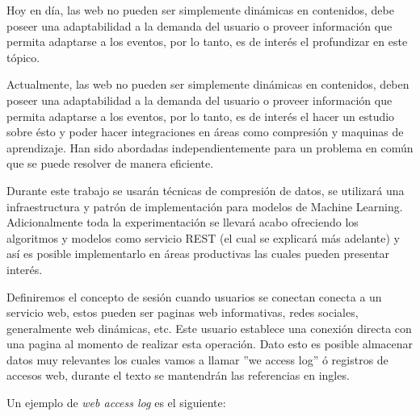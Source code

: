   Hoy en día, las web no pueden ser simplemente dinámicas en contenidos, debe poseer una adaptabilidad a la demanda del usuario o proveer información que permita adaptarse a los eventos, por lo tanto, es de interés el profundizar en este tópico.

  Actualmente, las web no pueden ser simplemente dinámicas en contenidos, deben poseer una adaptabilidad a la demanda del usuario o proveer información que permita adaptarse a los eventos, por lo tanto, es de interés el hacer un estudio sobre ésto y poder hacer integraciones en áreas como compresión y maquinas de aprendizaje. Han sido abordadas independientemente para un problema en común que se puede resolver de manera eficiente. 

  Durante este trabajo se usarán técnicas de compresión de datos, se utilizará una infraestructura y patrón de implementación para modelos de Machine Learning. Adicionalmente toda la experimentación se llevará acabo ofreciendo los algoritmos y modelos como servicio REST (el cual se explicará más adelante) y así es posible implementarlo en áreas productivas las cuales pueden presentar interés.

  Definiremos el concepto de sesión cuando usuarios se conectan conecta a un servicio web, estos pueden ser paginas web informativas, redes sociales, generalmente web dinámicas, etc. Este usuario establece una conexión directa con una pagina al momento de realizar esta operación. Dato esto es posible almacenar datos muy relevantes los cuales vamos a llamar ''we access log'' ó registros de accesos web, durante el texto se mantendrán las referencias en ingles.

  Un ejemplo de \emph{web access log} es el siguiente:


